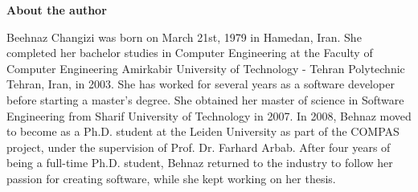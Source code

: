 \newpage
{\textbf{\Large{About the author}}}
\vspace*{1cm}

Beehnaz Changizi was born on March 21st, 1979 in Hamedan, Iran. She completed
her bachelor studies in Computer Engineering at the Faculty of Computer Engineering Amirkabir University of Technology - Tehran Polytechnic Tehran, Iran, in 2003. She  has worked for several years as a software developer before starting a master's degree. She obtained her master of science in Software Engineering from Sharif University of Technology in 2007.
In 2008, Behnaz moved to become as a Ph.D. student at the
Leiden University as part of the COMPAS project, under the supervision of Prof. Dr. Farhard Arbab. After four years of being a full-time Ph.D. student, Behnaz returned to the industry to follow her passion for creating software, while she kept working on her thesis.
